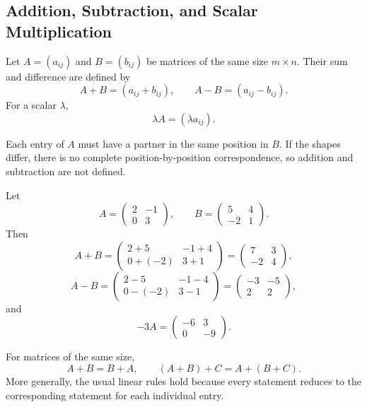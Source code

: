 \subsection{Addition, Subtraction, and Scalar Multiplication}

\begin{definitionbox}
Let $A=(a_{ij})$ and $B=(b_{ij})$ be matrices of the same size $m\times n$.
Their sum and difference are defined by
\[
A+B=(a_{ij}+b_{ij}),
\qquad
A-B=(a_{ij}-b_{ij}).
\]
For a scalar $\lambda$,
\[
\lambda A=(\lambda a_{ij}).
\]
\end{definitionbox}

\begin{interpretationbox}
Each entry of $A$ must have a partner in the same position in $B$. If the shapes
differ, there is no complete position-by-position correspondence, so addition and
subtraction are not defined.
\end{interpretationbox}

\begin{examplebox}
Let
\[
A=\begin{pmatrix}2&-1\\0&3\end{pmatrix},
\qquad
B=\begin{pmatrix}5&4\\-2&1\end{pmatrix}.
\]
Then
\[
A+B=
\begin{pmatrix}
2+5&-1+4\\
0+(-2)&3+1
\end{pmatrix}
=
\begin{pmatrix}7&3\\-2&4\end{pmatrix},
\]
\[
A-B=
\begin{pmatrix}
2-5&-1-4\\
0-(-2)&3-1
\end{pmatrix}
=
\begin{pmatrix}-3&-5\\2&2\end{pmatrix},
\]
and
\[
-3A=
\begin{pmatrix}-6&3\\0&-9\end{pmatrix}.
\]
\end{examplebox}

\begin{theorembox}
For matrices of the same size,
\[
A+B=B+A,
\qquad
(A+B)+C=A+(B+C).
\]
More generally, the usual linear rules hold because every statement reduces to
the corresponding statement for each individual entry.
\end{theorembox}

